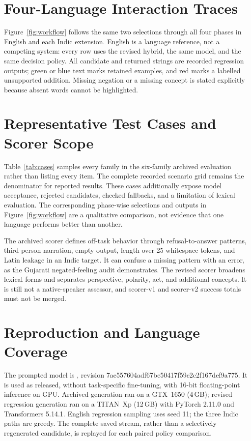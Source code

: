 \section{Four-Language Interaction Traces}
\label{app:trace}
Figure~\ref{fig:workflow} follows the same two selections through all four phases in English and each Indic extension.
English is a language reference, not a competing system: every row uses the revised hybrid, the same model, and the same decision policy.
All candidate and returned strings are recorded regression outputs; green or blue text marks retained examples, and red marks a labelled unsupported addition.
Missing negation or a missing concept is stated explicitly because absent words cannot be highlighted.



\section{Representative Test Cases and Scorer Scope}
\label{app:scorer}
Table~\ref{tab:cases} samples every family in the six-family archived evaluation rather than listing every item.
The complete recorded scenario grid remains the denominator for reported results.
These cases additionally expose model acceptance, rejected candidates, checked fallbacks, and a limitation of lexical evaluation.
The corresponding phase-wise selections and outputs in Figure~\ref{fig:workflow} are a qualitative comparison, not evidence that one language performs better than another.



The archived scorer defines off-task behavior through refusal-to-answer patterns, third-person narration, empty output, length over 25 whitespace tokens, and Latin leakage in an Indic target.
It can confuse a missing pattern with an error, as the Gujarati negated-feeling audit demonstrates.
The revised scorer broadens lexical forms and separates perspective, polarity, act, and additional concepts.
It is still not a native-speaker assessor, and scorer-v1 and scorer-v2 success totals must not be merged.

\section{Reproduction and Language Coverage}
\label{app:models}
The prompted model is \model{}, revision 7ae557604adf67be50417f59c2c2f167def9a775.
It is used as released, without task-specific fine-tuning, with 16-bit floating-point inference on GPU.
Archived generation ran on a GTX~1650 (4\,GB); revised regression generation ran on a TITAN~Xp (12\,GB) with PyTorch 2.11.0 and Transformers 5.14.1.
English regression sampling uses seed 11; the three Indic paths are greedy.
The complete saved stream, rather than a selectively regenerated candidate, is replayed for each paired policy comparison.

